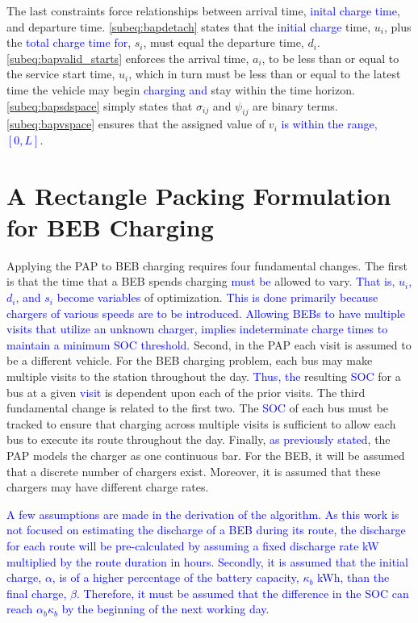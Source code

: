 \documentclass[utf8]{FrontiersinHarvard}
\begin{document}
The last constraints force relationships between arrival time, \textcolor{blue}{inital charge time}, and
departure time. \autoref{subeq:bapdetach} states that the \textcolor{blue}{ initial charge} time, \(u_i\), plus
the \textcolor{blue}{total charge time for}, \(s_i\), must equal the departure time, \(d_i\).
\autoref{subeq:bapvalid_starts} enforces the arrival time, \(a_i\), to be less than or equal to the service start time,
\(u_i\), which in turn must be less than or equal to the latest time the vehicle may begin
\textcolor{blue}{charging and} stay within the time horizon. \autoref{subeq:bapsdspace} simply states that
\(\sigma_{ij}\) and \(\psi_{ij}\) are binary terms. \autoref{subeq:bapvspace} ensures that the assigned value of \(v_i\)
\textcolor{blue}{is within the range, $[0,L]$}.
\section{A Rectangle Packing Formulation for BEB Charging}
\label{sec:problemformulation}
Applying the PAP to BEB charging requires four fundamental changes. The first is that the time that a BEB spends
charging \textcolor{blue}{must be} allowed to vary. \textcolor{blue}{That is, $u_i$, $d_i$, and $s_i$ become variables} of optimization. \textcolor{blue}{This is done primarily because chargers of various speeds are to be introduced. Allowing BEBs to have multiple visits that utilize an unknown charger, implies indeterminate charge times to maintain a minimum SOC threshold.} Second, in the PAP each visit is assumed to be a
different vehicle. For the BEB charging problem, each bus may make multiple visits to the station throughout the
day\textcolor{blue}{. Thus, the} resulting \textcolor{blue}{SOC} for a bus at a given
\textcolor{blue}{visit} is dependent upon each of the prior visits. The third fundamental change is related
to the first two. The \textcolor{blue}{SOC} of each bus must be tracked to ensure that charging across
multiple visits is sufficient to allow each bus to execute its route throughout the day. Finally,
\textcolor{blue}{as previously stated}, the PAP models the charger as one continuous bar. For the BEB, it
will be assumed that a discrete number of chargers exist. Moreover, it is assumed that these chargers may have different
charge rates.

\textcolor{blue}{A few assumptions are made in the derivation of the algorithm. As this work is not focused on
  estimating the discharge of a BEB during its route, the discharge for each route will be pre-calculated by assuming a
  fixed discharge rate kW multiplied by the route duration in hours. Secondly, it is assumed that the initial charge,
  $\alpha$, is of a higher percentage of the battery capacity, $\kappa_b$ kWh, than the final charge, $\beta$.
  Therefore, it must be assumed that the difference in the SOC can reach $\alpha_b\kappa_b$ by the beginning of the next
  working day.}
\end{document}
